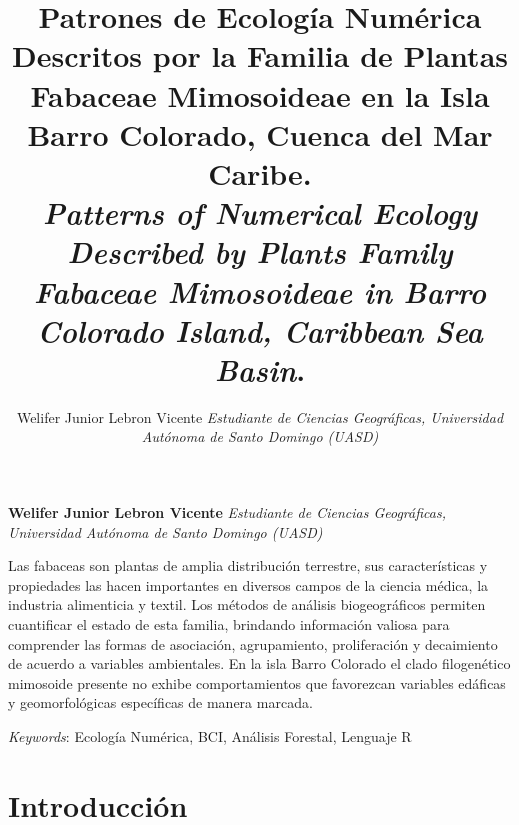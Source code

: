 \documentclass[11pt,]{article}
\title{Patrones de Ecología Numérica Descritos por la Familia de Plantas
Fabaceae Mimosoideae en la Isla Barro Colorado, Cuenca del Mar Caribe.\\
\emph{Patterns of Numerical Ecology Described by Plants Family Fabaceae
Mimosoideae in Barro Colorado Island, Caribbean Sea Basin}.\\  }
\author{\Large Welifer Junior Lebron Vicente\vspace{0.05in} \newline\normalsize\emph{Estudiante de Ciencias Geográficas, Universidad Autónoma de Santo
Domingo (UASD)}  }
\date{}
\newcommand*{\authorfont}{\fontfamily{phv}\selectfont}
\renewenvironment{abstract}
 {{%
    \setlength{\leftmargin}{0mm}
    \setlength{\rightmargin}{\leftmargin}%
  }%
  \relax}
 {\endlist}
\begin{document}
	
%

{%
\setlength{\parindent}{0pt}
\thispagestyle{plain}
{\fontsize{18}{20}\selectfont\raggedright 
\maketitle  %

}

{
   \vskip 13.5pt\relax \normalsize\fontsize{11}{12} 
\textbf{\authorfont Welifer Junior Lebron Vicente} \hskip 15pt \emph{\small Estudiante de Ciencias Geográficas, Universidad Autónoma de Santo
Domingo (UASD)}   

}

}








\begin{abstract}

    \hbox{\vrule height .2pt width 39.14pc}

    \vskip 8.5pt %

\noindent Las fabaceas son plantas de amplia distribución terrestre, sus
características y propiedades las hacen importantes en diversos campos
de la ciencia médica, la industria alimenticia y textil. Los métodos de
análisis biogeográficos permiten cuantificar el estado de esta familia,
brindando información valiosa para comprender las formas de asociación,
agrupamiento, proliferación y decaimiento de acuerdo a variables
ambientales. En la isla Barro Colorado el clado filogenético mimosoide
presente no exhibe comportamientos que favorezcan variables edáficas y
geomorfológicas específicas de manera marcada.


\vskip 8.5pt \noindent \emph{Keywords}: Ecología Numérica, BCI, Análisis Forestal, Lenguaje R \par

    \hbox{\vrule height .2pt width 39.14pc}



\end{abstract}


\vskip 6.5pt


\noindent  \section{Introducción}\label{introducciuxf3n}
\end{document}
